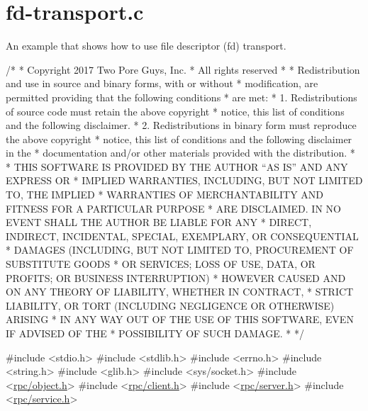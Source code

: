 \hypertarget{fd-transport_8c-example}{}\section{fd-\/transport.\+c}
An example that shows how to use file descriptor (fd) transport.


\begin{DoxyCodeInclude}
\textcolor{comment}{/*}
\textcolor{comment}{ * Copyright 2017 Two Pore Guys, Inc.}
\textcolor{comment}{ * All rights reserved}
\textcolor{comment}{ *}
\textcolor{comment}{ * Redistribution and use in source and binary forms, with or without}
\textcolor{comment}{ * modification, are permitted providing that the following conditions}
\textcolor{comment}{ * are met:}
\textcolor{comment}{ * 1. Redistributions of source code must retain the above copyright}
\textcolor{comment}{ *    notice, this list of conditions and the following disclaimer.}
\textcolor{comment}{ * 2. Redistributions in binary form must reproduce the above copyright}
\textcolor{comment}{ *    notice, this list of conditions and the following disclaimer in the}
\textcolor{comment}{ *    documentation and/or other materials provided with the distribution.}
\textcolor{comment}{ *}
\textcolor{comment}{ * THIS SOFTWARE IS PROVIDED BY THE AUTHOR ``AS IS'' AND ANY EXPRESS OR}
\textcolor{comment}{ * IMPLIED WARRANTIES, INCLUDING, BUT NOT LIMITED TO, THE IMPLIED}
\textcolor{comment}{ * WARRANTIES OF MERCHANTABILITY AND FITNESS FOR A PARTICULAR PURPOSE}
\textcolor{comment}{ * ARE DISCLAIMED.  IN NO EVENT SHALL THE AUTHOR BE LIABLE FOR ANY}
\textcolor{comment}{ * DIRECT, INDIRECT, INCIDENTAL, SPECIAL, EXEMPLARY, OR CONSEQUENTIAL}
\textcolor{comment}{ * DAMAGES (INCLUDING, BUT NOT LIMITED TO, PROCUREMENT OF SUBSTITUTE GOODS}
\textcolor{comment}{ * OR SERVICES; LOSS OF USE, DATA, OR PROFITS; OR BUSINESS INTERRUPTION)}
\textcolor{comment}{ * HOWEVER CAUSED AND ON ANY THEORY OF LIABILITY, WHETHER IN CONTRACT,}
\textcolor{comment}{ * STRICT LIABILITY, OR TORT (INCLUDING NEGLIGENCE OR OTHERWISE) ARISING}
\textcolor{comment}{ * IN ANY WAY OUT OF THE USE OF THIS SOFTWARE, EVEN IF ADVISED OF THE}
\textcolor{comment}{ * POSSIBILITY OF SUCH DAMAGE.}
\textcolor{comment}{ *}
\textcolor{comment}{ */}

\textcolor{preprocessor}{#include <stdio.h>}
\textcolor{preprocessor}{#include <stdlib.h>}
\textcolor{preprocessor}{#include <errno.h>}
\textcolor{preprocessor}{#include <string.h>}
\textcolor{preprocessor}{#include <glib.h>}
\textcolor{preprocessor}{#include <sys/socket.h>}
\textcolor{preprocessor}{#include <\hyperlink{object_8h}{rpc/object.h}>}
\textcolor{preprocessor}{#include <\hyperlink{client_8h}{rpc/client.h}>}
\textcolor{preprocessor}{#include <\hyperlink{server_8h}{rpc/server.h}>}
\textcolor{preprocessor}{#include <\hyperlink{service_8h}{rpc/service.h}>}


\end{DoxyCodeInclude}
